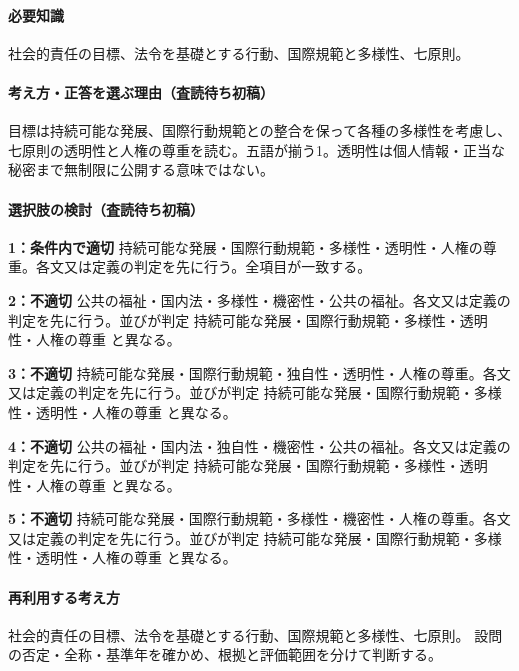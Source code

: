 \paragraph{必要知識} 社会的責任の目標、法令を基礎とする行動、国際規範と多様性、七原則。

\paragraph{考え方・正答を選ぶ理由（査読待ち初稿）} 目標は持続可能な発展、国際行動規範との整合を保って各種の多様性を考慮し、七原則の透明性と人権の尊重を読む。五語が揃う1。透明性は個人情報・正当な秘密まで無制限に公開する意味ではない。

\paragraph{選択肢の検討（査読待ち初稿）}\mbox{}\par

\noindent\textbf{1：条件内で適切} 持続可能な発展・国際行動規範・多様性・透明性・人権の尊重。各文又は定義の判定を先に行う。全項目が一致する。\par

\noindent\textbf{2：不適切} 公共の福祉・国内法・多様性・機密性・公共の福祉。各文又は定義の判定を先に行う。並びが判定 持続可能な発展・国際行動規範・多様性・透明性・人権の尊重 と異なる。\par

\noindent\textbf{3：不適切} 持続可能な発展・国際行動規範・独自性・透明性・人権の尊重。各文又は定義の判定を先に行う。並びが判定 持続可能な発展・国際行動規範・多様性・透明性・人権の尊重 と異なる。\par

\noindent\textbf{4：不適切} 公共の福祉・国内法・独自性・機密性・公共の福祉。各文又は定義の判定を先に行う。並びが判定 持続可能な発展・国際行動規範・多様性・透明性・人権の尊重 と異なる。\par

\noindent\textbf{5：不適切} 持続可能な発展・国際行動規範・多様性・機密性・人権の尊重。各文又は定義の判定を先に行う。並びが判定 持続可能な発展・国際行動規範・多様性・透明性・人権の尊重 と異なる。\par

\paragraph{再利用する考え方} 社会的責任の目標、法令を基礎とする行動、国際規範と多様性、七原則。 設問の否定・全称・基準年を確かめ、根拠と評価範囲を分けて判断する。

